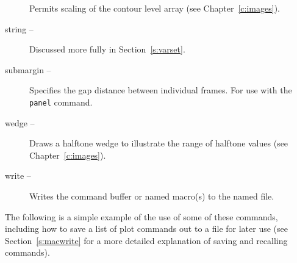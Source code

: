 \begin{description}
    Permits scaling of the contour level array
    (see Chapter~\ref{c:images}).
  \item [{string --}]%
    Discussed more fully in Section~\ref{s:varset}.
  \item [{submargin --}]
    Specifies the gap distance between individual frames.
    For use with the {\tt panel} command.
  \item [{wedge --}]%
    Draws a halftone wedge to illustrate the
    range of halftone values (see Chapter~\ref{c:images}).
  \item [{write --}]%
    Writes the command buffer or named
    macro(s) to the named file.
\end{description}
The following is a simple example of the use of some of these commands,
including how to save a list of plot commands out to a file for later use
(see Section~\ref{s:macwrite}
for a more detailed explanation of saving and recalling commands).
